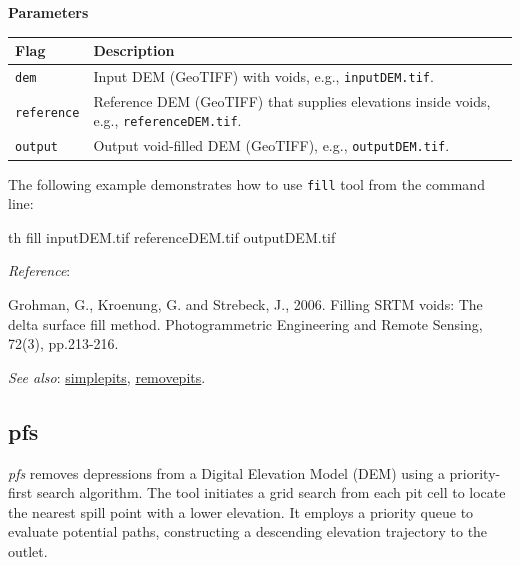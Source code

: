 \documentclass[
]{book}
\newenvironment{Shaded}{\begin{snugshade}}{\end{snugshade}}
\newcommand{\ExtensionTok}[1]{#1}
\newcommand{\NormalTok}[1]{#1}
\theoremstyle{definition}
\theoremstyle{definition}
\theoremstyle{definition}
\theoremstyle{definition}
\theoremstyle{remark}
\begin{document}
\textbf{Parameters}

\begin{longtable}[]{@{}
  >{\raggedright\arraybackslash}p{}
  >{\raggedright\arraybackslash}p{}@{}}
\toprule\noalign{}
\begin{minipage}[b]{\linewidth}\raggedright
Flag
\end{minipage} & \begin{minipage}[b]{\linewidth}\raggedright
Description
\end{minipage} \\
\midrule\noalign{}
\endhead
\bottomrule\noalign{}
\endlastfoot
\texttt{dem} & Input DEM (GeoTIFF) with voids, e.g., \texttt{inputDEM.tif}. \\
\texttt{reference} & Reference DEM (GeoTIFF) that supplies elevations inside voids, e.g., \texttt{referenceDEM.tif}. \\
\texttt{output} & Output void-filled DEM (GeoTIFF), e.g., \texttt{outputDEM.tif}. \\
\end{longtable}

The following example demonstrates how to use \texttt{fill} tool from the command line:

\begin{Shaded}
\begin{Highlighting}[]
\ExtensionTok{th}\NormalTok{ fill inputDEM.tif referenceDEM.tif outputDEM.tif}
\end{Highlighting}
\end{Shaded}

\emph{Reference}:

Grohman, G., Kroenung, G. and Strebeck, J., 2006. Filling SRTM voids: The delta surface fill method. Photogrammetric Engineering and Remote Sensing, 72(3), pp.213-216.

\emph{See also}: \hyperref[simplepits]{simplepits}, \hyperref[removepits]{removepits}.

\subsection{pfs}\label{pfs}

\emph{pfs} removes depressions from a Digital Elevation Model (DEM) using a priority-first search algorithm. The tool initiates a grid search from each pit cell to locate the nearest spill point with a lower elevation. It employs a priority queue to evaluate potential paths, constructing a descending elevation trajectory to the outlet.
\end{document}

